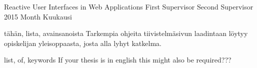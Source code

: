%
%


{}\finfalse

{Reactive User Interfaces in Web Applications}
{First Supervisor}
{Second Supervisor}
{2015}
{Month}
{Kuukausi} 


\gentitle

\begin{ittiivis}{tähän, lista, avainsanoista}
Tarkempia ohjeita tiivistelmäsivun laadintaan löytyy opiskelijan
yleisoppaasta, josta alla lyhyt katkelma.
\end{ittiivis}

\begin{itabstract}{list, of, keywords}
If your thesis is in english this might also be required???
\end{itabstract}


%
%
\pagestyle{empty}


%
%
\tableofcontents
\clearpage
\listoffigures 
\clearpage
\listoftables

